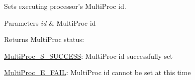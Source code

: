 Sets executing processor's Multi\-Proc id. 


\begin{DoxyParams}{Parameters}
{\em id} & Multi\-Proc id\\
\hline
\end{DoxyParams}
\begin{DoxyReturn}{Returns}
Multi\-Proc status\-:
\begin{DoxyItemize}
\item \hyperlink{_multi_proc_8h_a88ef69134ed8907ec46443a8c5445acd}{Multi\-Proc\-\_\-\-S\-\_\-\-S\-U\-C\-C\-E\-S\-S}\-: Multi\-Proc id successfully set
\item \hyperlink{_multi_proc_8h_ac3e4ff7eac6f0fe38b97b1ca086ea1c6}{Multi\-Proc\-\_\-\-E\-\_\-\-F\-A\-I\-L}\-: Multi\-Proc id cannot be set at this time 
\end{DoxyItemize}
\end{DoxyReturn}
